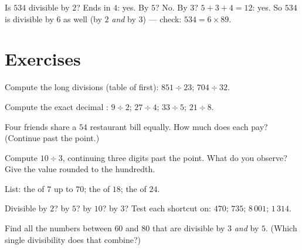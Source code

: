 \begin{example}\label{ex:g5:division:criteria}
Is $534$ divisible by $2$? Ends in $4$: yes. By $5$? No. By $3$?
$5 + 3 + 4 = 12$: yes. So $534$ is divisible by $6$ as well (by $2$
\emph{and} by $3$) --- check: $534 = 6 \times 89$.
\end{example}

\section{Exercises}

\begin{exercise}[$\star$]\label{exo:g5:division:1}
Compute the long divisions (table of  first):
$851 \div 23$; \quad $704 \div 32$.
\end{exercise}

\begin{exercise}[$\star$]\label{exo:g5:division:2}
Compute the exact decimal : $9 \div 2$; \quad $27 \div 4$;
\quad $33 \div 5$; \quad $21 \div 8$.
\end{exercise}

\begin{exercise}[$\star$]\label{exo:g5:division:3}
Four friends share a $54$ restaurant bill equally. How much does
each pay? (Continue past the point.)
\end{exercise}

\begin{exercise}[$\star$]\label{exo:g5:division:4}
Compute $10 \div 3$, continuing three digits past the point. What do
you observe? Give the value rounded to the hundredth.
\end{exercise}

\begin{exercise}[$\star$]\label{exo:g5:division:5}
List: the  of $7$ up to $70$; the  of $18$; the
 of $24$.
\end{exercise}

\begin{exercise}[$\star$]\label{exo:g5:division:6}
Divisible by $2$? by $5$? by $10$? by $3$? Test each shortcut on:
$470$; \quad $735$; \quad $8\,001$; \quad $1\,314$.
\end{exercise}

\begin{exercise}[$\star$]\label{exo:g5:division:7}
Find all the numbers between $60$ and $80$ that are divisible by
$3$ \emph{and} by $5$. (Which single divisibility does that
combine?)
\end{exercise}

